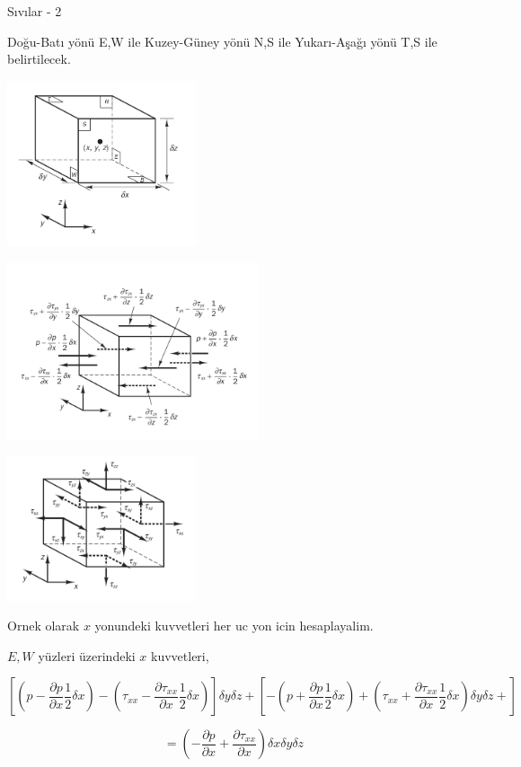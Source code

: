\documentclass[12pt,fleqn]{article}\usepackage{../../common}
\begin{document}
Sıvılar - 2

Doğu-Batı yönü E,W ile Kuzey-Güney yönü N,S ile Yukarı-Aşağı yönü T,S
ile belirtilecek. 

\includegraphics[width=15em]{phy_030_fluid2_03.png}

\includegraphics[width=20em]{phy_030_fluid2_01.png}

\includegraphics[width=15em]{phy_030_fluid2_02.png}


Ornek olarak $x$ yonundeki kuvvetleri her uc yon icin hesaplayalim.

$E,W$ yüzleri üzerindeki $x$ kuvvetleri, 

$$
\left[
  \left( p - \frac{\partial p}{\partial x} \frac{1}{2} \delta x \right) -
  \left( \tau_{xx} - \frac{\partial \tau_{xx}}{\partial x} \frac{1}{2} \delta x \right) 
\right]
  \delta y \delta z  +
\left[
  -\left( p + \frac{\partial p}{\partial x} \frac{1}{2} \delta x \right) +
  \left( \tau_{xx} + \frac{\partial \tau_{xx}}{\partial x} \frac{1}{2} \delta x \right) 
  \delta y \delta z  +  
\right]
$$

$$
= \left(
-\frac{\partial p}{\partial x} + \frac{\partial \tau_{xx}}{\partial x}
\right)
\delta x \delta y \delta z
$$
\end{document}
